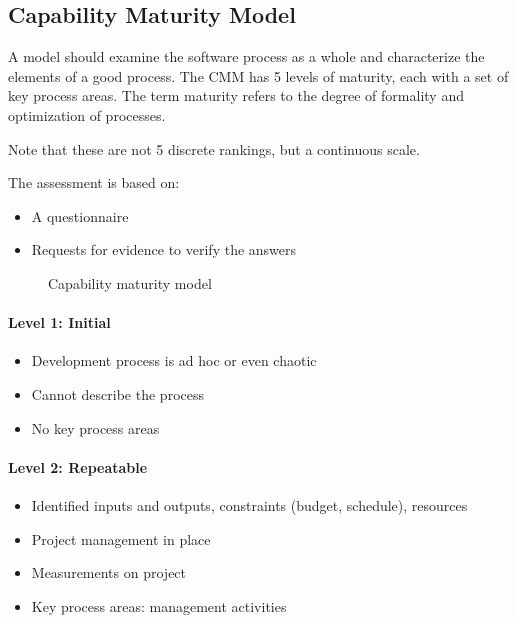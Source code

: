 \subsection{Capability Maturity Model}
A model should examine the software process as a whole and characterize
the elements of a good process. The CMM has 5 levels of maturity, each with a
set of key process areas. The term maturity refers to the degree of formality
and optimization of processes. 

 Note that these are not 5 discrete rankings, but a
continuous scale.\newline

The assessment is based on:
\begin{itemize}
    \item A questionnaire
    \item Requests for evidence to verify the answers
\end{itemize}

\begin{figure}[!ht]
    \centering
    \begin{scriptsize}
        
    \end{scriptsize}
    \caption{Capability maturity model}
\end{figure}

\paragraph{Level 1: Initial}
\begin{itemize}
    \item Development process is ad hoc or even chaotic
    \item Cannot describe the process
    \item No key process areas
\end{itemize}

\paragraph{Level 2: Repeatable}
\begin{itemize}
    \item Identified inputs and outputs, constraints (budget, schedule), resources
    \item Project management in place
    \item Measurements on project
    \item Key process areas: management activities
\end{itemize}

